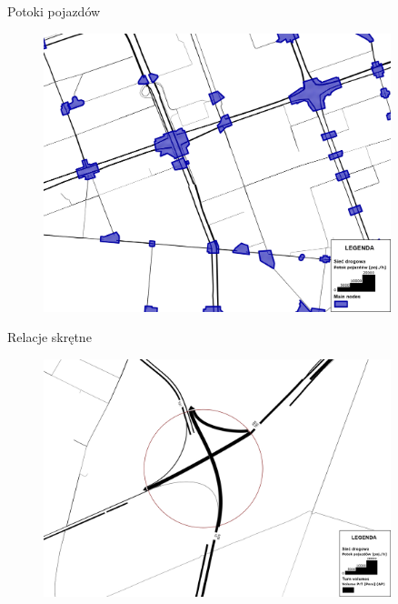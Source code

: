 \documentclass[8pt]{beamer}
\begin{document}
\begin{frame}{Potoki pojazdów}
\begin{figure}\begin{center}
\includegraphics[width=0.9\textwidth]{prt_flows2}
 \end{center}  \end{figure} 
\end{frame}

\begin{frame}{Relacje skrętne}
\begin{figure}\begin{center}
\includegraphics[width=0.9\textwidth]{turn_flows}
 \end{center}  \end{figure} 
\end{frame}
\end{document}
